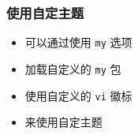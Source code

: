 \documentclass{ctexbeamer}
\begin{document}
\begin{frame}
    \frametitle{使用自定主题}
    \begin{itemize}
        \item 可以通过使用 \texttt{my} 选项
        \item 加载自定义的 \texttt{my} 包
        \item 使用自定义的 \texttt{vi} 徽标
        \item 来使用自定主题
    \end{itemize}
\end{frame}
\end{document}
